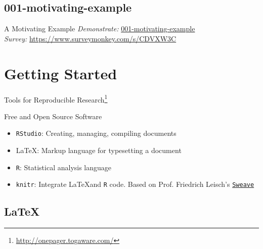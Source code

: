 \documentclass[10pt]{beamer}\usepackage[]{graphicx}\usepackage[]{color}
\begin{document}
\subsection{001-motivating-example}

\begin{frame}{A Motivating Example}
\textit{Demonstrate:} \href{https://github.com/sahirbhatnagar/knitr-tutorial/tree/master/001-motivating-example}{001-motivating-example}\\

\textit{Survey:}
\href{https://www.surveymonkey.com/s/CDVXW3C}{https://www.surveymonkey.com/s/CDVXW3C}
\end{frame}



\section{Getting Started}

\begin{frame}{Tools for Reproducible Research\footnote{\href{http://onepager.togaware.com/}{http://onepager.togaware.com/}}}


\begin{block}{Free and Open Source Software}
\begin{itemize}
\item \texttt{RStudio}: Creating, managing, compiling documents
\item \LaTeX: Markup language for typesetting a document
\item \texttt{R}: Statistical analysis language
\item \texttt{knitr}: Integrate \LaTeX and \texttt{R} code. Based on Prof. Friedrich Leisch's \href{https://www.statistik.lmu.de/~leisch/Sweave/}{\texttt{Sweave}}
\end{itemize}
\end{block}
\end{frame}


\subsection{\LaTeX}
\end{document}
